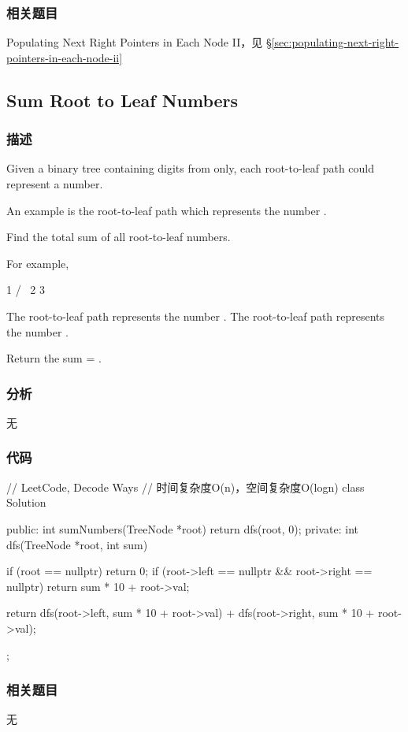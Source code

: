 \subsubsection{相关题目}
\begindot
\item Populating Next Right Pointers in Each Node II，见 \S \ref{sec:populating-next-right-pointers-in-each-node-ii}
\myenddot


\subsection{Sum Root to Leaf Numbers} %
\label{sec:sum-root-to-leaf-numbers}


\subsubsection{描述}
Given a binary tree containing digits from  only, each root-to-leaf path could represent a number.

An example is the root-to-leaf path  which represents the number .

Find the total sum of all root-to-leaf numbers.

For example,
\begin{Code}
    1
   / \
  2   3
\end{Code}

The root-to-leaf path  represents the number .
The root-to-leaf path  represents the number .

Return the sum = .


\subsubsection{分析}
无

\subsubsection{代码}

\begin{Code}
// LeetCode, Decode Ways
// 时间复杂度O(n)，空间复杂度O(logn)
class Solution {
public:
    int sumNumbers(TreeNode *root) {
        return dfs(root, 0);
    }
private:
    int dfs(TreeNode *root, int sum) {
        if (root == nullptr) return 0;
        if (root->left == nullptr && root->right == nullptr)
            return sum * 10 + root->val;

        return dfs(root->left, sum * 10 + root->val) +
                dfs(root->right, sum * 10 + root->val);
    }
};
\end{Code}


\subsubsection{相关题目}
\begindot
\item 无
\myenddot
